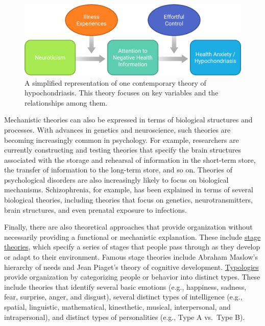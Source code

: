 \documentclass[
]{krantz}
\begin{document}
\begin{figure}

{\centering \includegraphics[width=0.8\linewidth]{images/theory/hypo} 

}

\caption{A simplified representation of one contemporary theory of hypochondriasis. This theory focuses on key variables and the relationships among them.}\label{fig:hypo}
\end{figure}

Mechanistic theories can also be expressed in terms of biological structures and processes. With advances in genetics and neuroscience, such theories are becoming increasingly common in psychology. For example, researchers are currently constructing and testing theories that specify the brain structures associated with the storage and rehearsal of information in the short-term store, the transfer of information to the long-term store, and so on. Theories of psychological disorders are also increasingly likely to focus on biological mechanisms. Schizophrenia, for example, has been explained in terms of several biological theories, including theories that focus on genetics, neurotransmitters, brain structures, and even prenatal exposure to infections.

Finally, there are also theoretical approaches that provide organization without necessarily providing a functional or mechanistic explanation. These include \protect\hyperlink{stage-theory}{stage theories}, which specify a series of stages that people pass through as they develop or adapt to their environment. Famous stage theories include Abraham Maslow's hierarchy of needs and Jean Piaget's theory of cognitive development. \protect\hyperlink{typology}{Typologies} provide organization by categorizing people or behavior into distinct types. These include theories that identify several basic emotions (e.g., happiness, sadness, fear, surprise, anger, and disgust), several distinct types of intelligence (e.g., spatial, linguistic, mathematical, kinesthetic, musical, interpersonal, and intrapersonal), and distinct types of personalities (e.g., Type A vs.~Type B).
\end{document}
